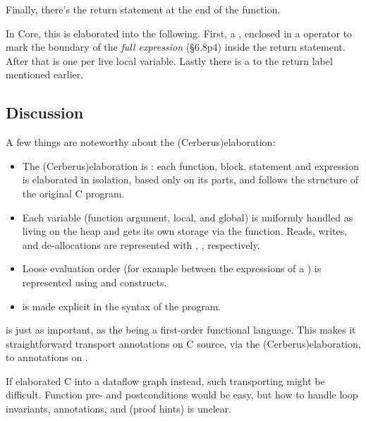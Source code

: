 
Finally, there's the return statement at the end of the function.


In Core, this is elaborated into the following. First, a
, enclosed in a  operator
to mark the boundary of the \emph{full expression} (§6.8p4) inside the return
statement. After that is one  per live 
local variable. Lastly there is a  to the
return label  mentioned earlier.


\subsection{Discussion}\label{subsec:elab-discussion}

A few things are noteworthy about the  \kl(Cerberus){elaboration}:
\begin{itemize}
    \item The \kl(Cerberus){elaboration} is : each function, block,
        statement and expression is elaborated in isolation, based only
        on its parts, and follows the structure of the original C program.
    \item Each variable (function argument, local, and global) is uniformly
        handled as living on the heap and gets its own storage via the
         function. Reads, writes, and de-allocations are
        represented with , ,
         respectively.
    \item Loose evaluation order (for example between the expressions of a \cinline{==})
        is represented using  and  constructs.
    \item {} is made explicit in the syntax of the program.
\end{itemize}

 is just as important, as the  being a
first-order functional language. This makes it straightforward transport
annotations on C source, via the \kl(Cerberus){elaboration}, to annotations on .

If  elaborated C into a dataflow graph instead,
such transporting might be difficult. Function pre- and postconditions would
be easy, but how to handle loop invariants,  annotations, and
 (proof hints) is unclear.

